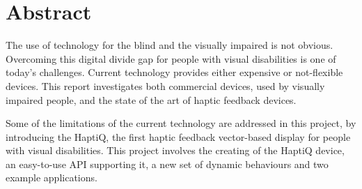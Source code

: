 \section{Abstract}

The use of technology for the blind and the visually impaired is not obvious. Overcoming this digital divide gap for people with visual disabilities is one of today's challenges. Current technology provides either expensive or not-flexible devices. 
This report investigates both commercial devices, used by visually impaired people, and the state of the art of haptic feedback devices. 

Some of the limitations of the current technology are addressed in this project, by introducing the HaptiQ, the first haptic feedback vector-based display for people with visual disabilities. This project involves the creating of the HaptiQ device, an easy-to-use API supporting it, a new set of dynamic behaviours and two example applications. 


